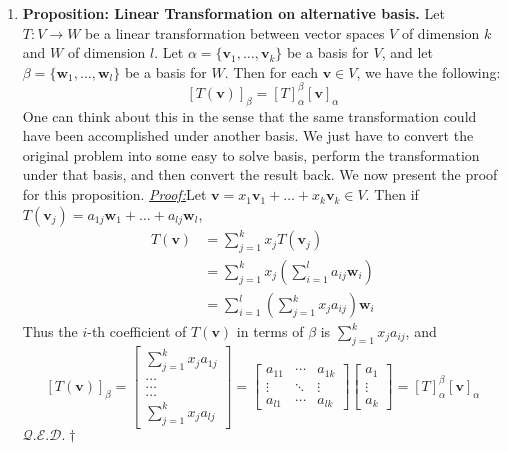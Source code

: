 \documentclass[oneside, 12pt]{book}
\newcommand{\settag}[1]{\renewcommand{\theenumi}{#1}}
\newcommand{\qed}{\hfill $\mathcal{Q}.\mathcal{E}.\mathcal{D}.\dagger$}
\newcommand{\tbf}[1]{\textbf{#1}}
\newcommand{\tit}[1]{\textit{#1}}
\newcommand{\proof}{\tit{\underline{Proof:}}} %
\newcommand{\vv}{\mathbf{v}}
\begin{document}
\begin{enumerate}
        \settag{2.2.15}
        \item \tbf{Proposition: Linear Transformation on alternative basis.} Let $T:V\xrightarrow{} W$ be a linear transformation between vector spaces $V$ of dimension $k$ and $W$ of dimension $l$. Let $\alpha = \{\mathbf{v}_1,\ldots,\mathbf{v}_k\}$ be a basis for $V$, and let $\beta = \{\mathbf{w}_1,\ldots,\mathbf{w}_l\}$ be a basis for $W$. Then for each $\mathbf{v} \in V$, we have the following:
        \begin{equation*}
            \left[T(\mathbf{v})\right]_\beta = \left[T\right]^\beta_\alpha\left[\mathbf{v}\right]_\alpha
        \end{equation*}
        One can think about this in the sense that the same transformation could have been accomplished under another basis. We just have to convert the original problem into some easy to solve basis, perform the transformation under that basis, and then convert the result back. We now present the proof for this proposition.\newline
        \proof Let $\mathbf{v}=x_1\mathbf{v}_1 + \ldots + x_k\mathbf{v}_k\in V$. Then if $T(\mathbf{v}_j)=a_{1j}\mathbf{w}_1 + \ldots + a_{lj}\mathbf{w}_l$, 
        \begin{align*}
            T(\mathbf{v}) &= \sum_{j=1}^k x_j T(\mathbf{v}_j) \\
            &= \sum_{j=1}^k x_j \left(\sum_{i=1}^{l}a_{ij}\mathbf{w}_i\right) \\
            &= \sum_{i=1}^l\left(\sum_{j=1}^k x_j a_{ij} \right)\mathbf{w}_i
        \end{align*}
        Thus the $i$-th coefficient of $T(\mathbf{v})$ in terms of $\beta$ is $\sum_{j=1}^k x_j a_{ij}$, and
        \begin{equation*}
            \left[T(\mathbf{v})\right]_\beta = 
            \begin{bmatrix}\sum_{j=1}^kx_ja_{1j} 
            \\ \dots 
            \\ \dots 
            \\ \dots 
            \\ \sum_{j=1}^kx_ja_{lj}
            \end{bmatrix}
            =
            \begin{bmatrix}
            a_{11} & \cdots & a_{1k} \\
            \vdots & \ddots & \vdots \\
            a_{l1} & \cdots & a_{lk}
            \end{bmatrix}
            \begin{bmatrix}
            a_1 \\ \vdots \\ a_k
            \end{bmatrix}
            =\left[T\right]_\alpha^\beta\left[\vv\right]_\alpha
        \end{equation*}
        \qed
        

\end{enumerate}
\end{document}
